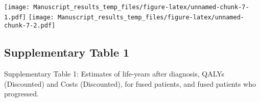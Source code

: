 \documentclass[
]{article}
\begin{document}
\texttt{[image: Manuscript\_results\_temp\_files/figure-latex/unnamed-chunk-7-1.pdf]}
\texttt{[image: Manuscript\_results\_temp\_files/figure-latex/unnamed-chunk-7-2.pdf]}

\hypertarget{supplementary-table-1}{%
\subsection{Supplementary Table 1}\label{supplementary-table-1}}

Supplementary Table 1: Estimates of life-years after diagnosis, QALYs
(Discounted) and Costs (Discounted), for fused patients, and fused
patients who progressed.
\end{document}
